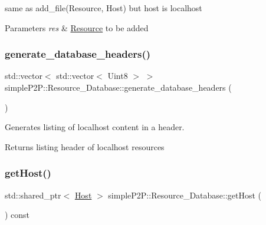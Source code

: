 same as add\+\_\+file(\+Resource, Host) but host is localhost 


\begin{DoxyParams}{Parameters}
{\em res} & \hyperlink{classsimpleP2P_1_1Resource}{Resource} to be added \\
\hline
\end{DoxyParams}
\mbox{\label{classsimpleP2P_1_1Resource__Database_a77b35fd391868164073005ffbd0377ae}} 
\subsubsection{\texorpdfstring{generate\+\_\+database\+\_\+headers()}{generate\_database\_headers()}}
{\footnotesize\ttfamily std\+::vector$<$ std\+::vector$<$ Uint8 $>$ $>$ simple\+P2\+P\+::\+Resource\+\_\+\+Database\+::generate\+\_\+database\+\_\+headers (\begin{DoxyParamCaption}{ }\end{DoxyParamCaption})}



Generates listing of localhost content in a header. 

\begin{DoxyReturn}{Returns}
listing header of localhost resources 
\end{DoxyReturn}
\mbox{\label{classsimpleP2P_1_1Resource__Database_a3d3e448f6b0502129e68d42214e1a059}} 
\subsubsection{\texorpdfstring{get\+Host()}{getHost()}}
{\footnotesize\ttfamily std\+::shared\+\_\+ptr$<$ \hyperlink{classsimpleP2P_1_1Host}{Host} $>$ simple\+P2\+P\+::\+Resource\+\_\+\+Database\+::get\+Host (\begin{DoxyParamCaption}{ }\end{DoxyParamCaption}) const}



